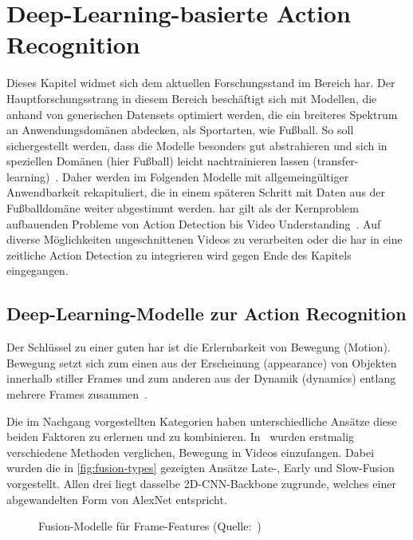 \chapter{Deep-Learning-basierte Action Recognition}
\label{ch:sota}

Dieses Kapitel widmet sich dem aktuellen Forschungsstand im Bereich \gls{har}.
Der Hauptforschungsstrang in diesem Bereich beschäftigt sich mit Modellen, die anhand von generischen Datensets optimiert werden, die ein breiteres Spektrum an Anwendungsdomänen abdecken, als Sportarten, wie Fußball.
So soll sichergestellt werden, dass die Modelle besonders gut abstrahieren und sich in speziellen Domänen (hier Fußball) leicht nachtrainieren lassen (\gls{transfer-learning})~\cite{Burkov19}.
Daher werden im Folgenden Modelle mit allgemeingültiger Anwendbarkeit rekapituliert, die in einem späteren Schritt mit Daten aus der Fußballdomäne weiter abgestimmt werden.
\gls{har} gilt als der Kernproblem aufbauenden Probleme von Action Detection bis Video Understanding~\cite{Jiang19,Xia20}.
Auf diverse Möglichkeiten ungeschnittenen Videos zu verarbeiten oder die \gls{har} in eine zeitliche Action Detection zu integrieren wird gegen Ende des Kapitels eingegangen.

\section{Deep-Learning-Modelle zur Action Recognition}
\label{sec:deep-learning-modelle-zur-action-recognition}

Der Schlüssel zu einer guten \gls{har} ist die Erlernbarkeit von Bewegung (Motion).
Bewegung setzt sich zum einen aus der Erscheinung (appearance) von Objekten innerhalb stiller Frames und zum anderen aus der Dynamik (dynamics) entlang mehrere Frames zusammen~\cite{Sun15,Wang16}.

Die im Nachgang vorgestellten Kategorien haben unterschiedliche Ansätze diese beiden Faktoren zu erlernen und zu kombinieren.
In~\cite{Karpathy14} wurden erstmalig verschiedene Methoden verglichen, Bewegung in Videos einzufangen.
Dabei wurden die in \autoref{fig:fusion-types} gezeigten Ansätze Late-, Early und Slow-Fusion vorgestellt.
Allen drei liegt dasselbe 2D-CNN-Backbone zugrunde, welches einer abgewandelten Form von AlexNet entspricht.

\begin{figure}[h!]
    \centering
    \caption{Fusion-Modelle für Frame-Features (Quelle:~\cite{Karpathy14})}
    \label{fig:fusion-types}
\end{figure}

